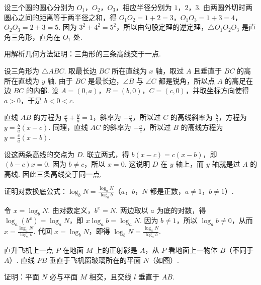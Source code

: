 \begin{solution}
设三个圆的圆心分别为 \(O_1\)，\(O_2\)，\(O_3\)，相应半径分别为 \(1\)，\(2\)，\(3\). 由两圆外切时两圆心之间的距离等于两半径之和，得 \(O_1O_2=1+2=3\)，\(O_1O_3=1+3=4\)，\(O_2O_3=2+3=5\). 因为 \(3^{2}+4^{2}=5^{2}\)，所以由勾股定理的逆定理，\(\triangle O_1O_2O_3\) 是直角三角形，直角在 \(O_1\) 处.
\end{solution}

\begin{problem}
用解析几何方法证明：三角形的三条高线交于一点.
\end{problem}

\begin{solution}
设三角形为 \(\triangle ABC\). 取最长边 \(BC\) 所在直线为 \(x\) 轴，取过 \(A\) 且垂直于 \(BC\) 的高所在直线为 \(y\) 轴. 由于 \(BC\) 是最长边，\(\angle B\) 与 \(\angle C\) 都是锐角，所以点 \(A\) 的高足在边 \(BC\) 的内部. 设 \(A=(0,a)\)，\(B=(b,0)\)，\(C=(c,0)\)，并取坐标方向使得 \(a>0\)，于是 \(b<0<c\).

直线 \(AB\) 的方程为 \(\frac{x}{b}+\frac{y}{a}=1\)，斜率为 \(-\frac{a}{b}\)，所以过 \(C\) 的高线斜率为 \(\frac{b}{a}\)，方程为 \(y=\frac{b}{a}(x-c)\). 同理，直线 \(AC\) 的斜率为 \(-\frac{a}{c}\)，所以过 \(B\) 的高线方程为 \(y=\frac{c}{a}(x-b)\).

设这两条高线的交点为 \(D\). 联立两式，得 \(b(x-c)=c(x-b)\)，即 \((b-c)x=0\). 因为 \(b\neq c\)，所以 \(x=0\). 这说明 \(D\) 在 \(y\) 轴上，而 \(y\) 轴就是过 \(A\) 的高线. 因此三条高线交于同一点.
\end{solution}

\begin{problem}
证明对数换底公式：\(\log_b N = \frac{\log_a N}{\log_a b}\)（\(a\)，\(b\)，\(N\) 都是正数，\(a \neq 1\)，\(b \neq 1\)）.
\end{problem}

\begin{solution}
令 \(x=\log_b N\). 由对数定义，\(b^x=N\). 两边取以 \(a\) 为底的对数，得 \(\log_a\left(b^x\right)=\log_a N\)，即 \(x\log_a b=\log_a N\). 因为 \(b\neq1\)，所以 \(\log_a b\neq0\)，从而 \(x=\frac{\log_a N}{\log_a b}\). 代回 \(x=\log_b N\)，即得 \(\log_b N=\frac{\log_a N}{\log_a b}\).
\end{solution}

\begin{problem}
直升飞机上一点 \(P\) 在地面 \(M\) 上的正射影是 \(A\)，从 \(P\) 看地面上一物体 \(B\)（不同于 \(A\)）. 直线 \(PB\) 垂直于飞机窗玻璃所在的平面 \(N\)（如图）.

证明：平面 \(N\) 必与平面 \(M\) 相交，且交线 \(l\) 垂直于 \(AB\).

\begin{center}
\end{center}
\end{problem}

